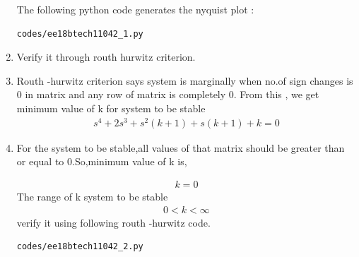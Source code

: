 \begin{enumerate}[label=\thesection.\arabic*.,ref=\thesection.\theenumi]
\center The following python code generates the nyquist plot : 
\begin{lstlisting}
codes/ee18btech11042_1.py
\end{lstlisting}


\item Verify it through routh hurwitz criterion.  
\item  Routh -hurwitz criterion says system is marginally  when no.of sign changes is 0 in matrix and any row of matrix is completely 0. From this , we get minimum value of k for system to be stable
\begin{align}
s^4+2s^3+s^2(k+1)+s(k+1)+k = 0
\label{eq:ee18btech11042_6}
\end{align}
\item For the system to be stable,all values of that matrix should be greater than or equal to 0.So,minimum value of k is,


\begin{align}
k = 0
\label{eq:ee18btech11042_7}
\end{align}
The range of k system to be stable
\begin{align}
0<k<\infty
\label{eq:ee18btech11042_8}
\end{align}
verify it using following routh -hurwitz code.

\begin{lstlisting}
codes/ee18btech11042_2.py
\end{lstlisting}
\end{enumerate}
